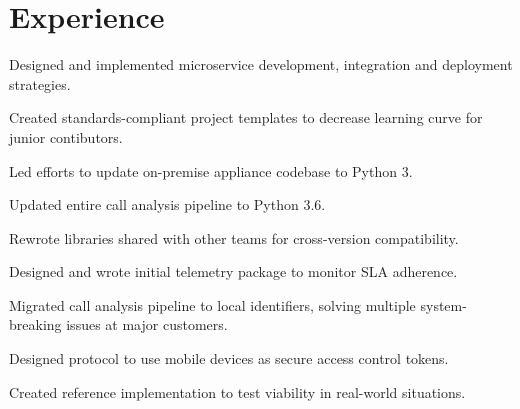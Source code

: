 \documentclass[]{deedy-resume-openfont}
\begin{document}
\begin{minipage}[t]{0.64\textwidth}


\section{Experience}
\vspace{\topsep} %
\begin{tightemize}
\item Designed and implemented microservice development, integration and deployment strategies.
\item Created standards-compliant project templates to decrease learning curve for junior contibutors.
\end{tightemize}
\sectionsep

\begin{tightemize}
\item Led efforts to update on-premise appliance codebase to Python 3.
\item Updated entire call analysis pipeline to Python 3.6.
\item Rewrote libraries shared with other teams for cross-version compatibility.
\item Designed and wrote initial telemetry package to monitor SLA adherence. 
\item Migrated call analysis pipeline to local identifiers, solving multiple system-breaking issues at major customers.
\end{tightemize}
\sectionsep

\begin{tightemize}
\item Designed protocol to use mobile devices as secure access control tokens.
\item Created reference implementation to test viability in real-world situations.
\end{tightemize}
\sectionsep



\end{minipage}
\end{document}

